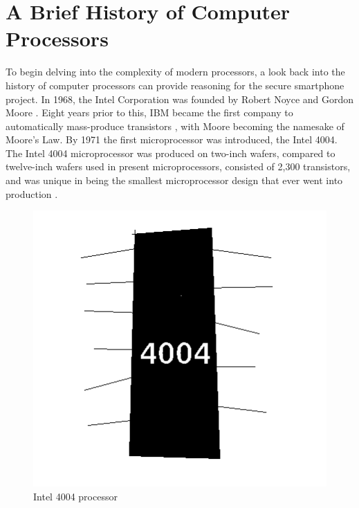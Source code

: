 
\section{A Brief History of Computer Processors}

To begin delving into the complexity of modern processors, a look back into the history of computer processors can provide reasoning for the secure smartphone project. 
In 1968, the Intel Corporation was founded by Robert Noyce and Gordon Moore \cite{RN2}.
Eight years prior to this, IBM became the first company to automatically mass-produce transistors \cite{RN2}, with Moore becoming the namesake of Moore’s Law.
By 1971 the first microprocessor was introduced, the Intel 4004.
The Intel 4004 microprocessor was produced on two-inch wafers, compared to twelve-inch wafers used in present microprocessors, consisted of 2,300 transistors, and was unique in being the smallest microprocessor design that ever went into production \cite{RN5}.

\begin{figure}
	\includegraphics[width=\linewidth]{4004.jpg}
	\caption{Intel 4004 processor \cite{RN9}}
	\label{fig:4004}
\end{figure}

